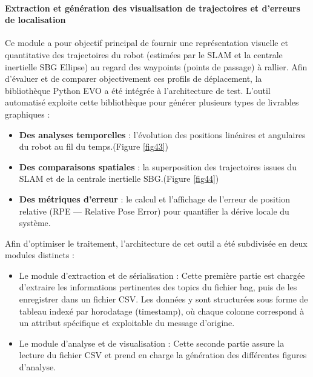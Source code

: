 \paragraph{Extraction et génération des visualisation de trajectoires et d'erreurs de localisation}

Ce module a pour objectif principal de fournir une représentation visuelle et quantitative des trajectoires du robot (estimées par le SLAM et la centrale inertielle SBG Ellipse) au regard des waypoints (points de passage) à rallier. Afin d'évaluer et de comparer objectivement ces profils de déplacement, la bibliothèque Python EVO a été intégrée à l'architecture de test. L'outil automatisé exploite cette bibliothèque pour générer plusieurs types de livrables graphiques :\\

\begin{itemize}
\renewcommand{\labelitemi}{$\bullet$}
    \item \textbf{Des analyses temporelles} : l'évolution des positions linéaires et angulaires du robot au fil du temps.(Figure \ref{fig43})
    \item \textbf{Des comparaisons spatiales} : la superposition des trajectoires issues du SLAM et de la centrale inertielle SBG.(Figure \ref{fig44})
    \item  \textbf{Des métriques d'erreur} : le calcul et l'affichage de l'erreur de position relative (RPE — Relative Pose Error) pour quantifier la dérive locale du système.\\
\end{itemize}

\indent Afin d'optimiser le traitement, l'architecture de cet outil a été subdivisée en deux modules distincts :\\

\begin{itemize}
\renewcommand{\labelitemi}{$\bullet$}
    \item Le module d'extraction et de sérialisation : Cette première partie est chargée d'extraire les informations pertinentes des topics du fichier bag, puis de les enregistrer dans un fichier CSV. Les données y sont structurées sous forme de tableau indexé par horodatage (timestamp), où chaque colonne correspond à un attribut spécifique et exploitable du message d'origine.
    \item Le module d'analyse et de visualisation : Cette seconde partie assure la lecture du fichier CSV et prend en charge la génération des différentes figures d'analyse.\\
\end{itemize}

